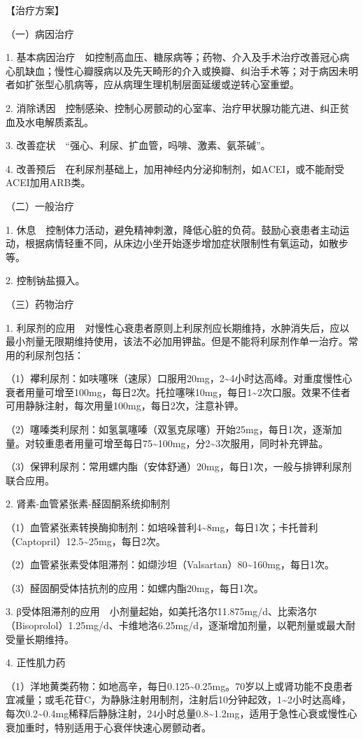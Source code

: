 【治疗方案】

{（一）病因治疗}

1.
基本病因治疗　如控制高血压、糖尿病等；药物、介入及手术治疗改善冠心病心肌缺血；慢性心瓣膜病以及先天畸形的介入或换瓣、纠治手术等；对于病因未明者如扩张型心肌病等，应从病理生理机制层面延缓或逆转心室重塑。

2.
消除诱因　控制感染、控制心房颤动的心室率、治疗甲状腺功能亢进、纠正贫血及水电解质紊乱。

3. 改善症状　“强心、利尿、扩血管，吗啡、激素、氨茶碱”。

4.
改善预后　在利尿剂基础上，加用神经内分泌抑制剂，如ACEI，或不能耐受ACEI加用ARB类。

{（二）一般治疗}

1.
休息　控制体力活动，避免精神刺激，降低心脏的负荷。鼓励心衰患者主动运动，根据病情轻重不同，从床边小坐开始逐步增加症状限制性有氧运动，如散步等。

2. 控制钠盐摄入。

{（三）药物治疗}

1.
利尿剂的应用　对慢性心衰患者原则上利尿剂应长期维持，水肿消失后，应以最小剂量无限期维持使用，该法不必加用钾盐。但是不能将利尿剂作单一治疗。常用的利尿剂包括：

（1）襻利尿剂：如呋噻咪（速尿）口服用20mg，2\textasciitilde{}4小时达高峰。对重度慢性心衰者用量可增至100mg，每日2次。托拉噻咪10mg，每日1\textasciitilde{}2次口服。效果不佳者可用静脉注射，每次用量100mg，每日2次，注意补钾。

（2）噻嗪类利尿剂：如氢氯噻嗪（双氢克尿噻）开始25mg，每日1次，逐渐加量。对较重患者用量可增至每日75\textasciitilde{}100mg，分2\textasciitilde{}3次服用，同时补充钾盐。

（3）保钾利尿剂：常用螺内酯（安体舒通）20mg，每日1次，一般与排钾利尿剂联合应用。

2. 肾素-血管紧张素-醛固酮系统抑制剂

（1）血管紧张素转换酶抑制剂：如培哚普利4\textasciitilde{}8mg，每日1次；卡托普利（Captopril）12.5\textasciitilde{}25mg，每日2次。

（2）血管紧张素受体阻滞剂：如缬沙坦（Valsartan）80\textasciitilde{}160mg，每日1次。

（3）醛固酮受体拮抗剂的应用：如螺内酯20mg，每日1次。

3.
β受体阻滞剂的应用　小剂量起始，如美托洛尔11.875mg/d、比索洛尔（Bisoprolol）1.25mg/d、卡维地洛6.25mg/d，逐渐增加剂量，以靶剂量或最大耐受量长期维持。

4. 正性肌力药

（1）洋地黄类药物：如地高辛，每日0.125\textasciitilde{}0.25mg。70岁以上或肾功能不良患者宜减量；或毛花苷C，为静脉注射用制剂，注射后10分钟起效，1\textasciitilde{}2小时达高峰，每次0.2\textasciitilde{}0.4mg稀释后静脉注射，24小时总量0.8\textasciitilde{}1.2mg，适用于急性心衰或慢性心衰加重时，特别适用于心衰伴快速心房颤动者。

